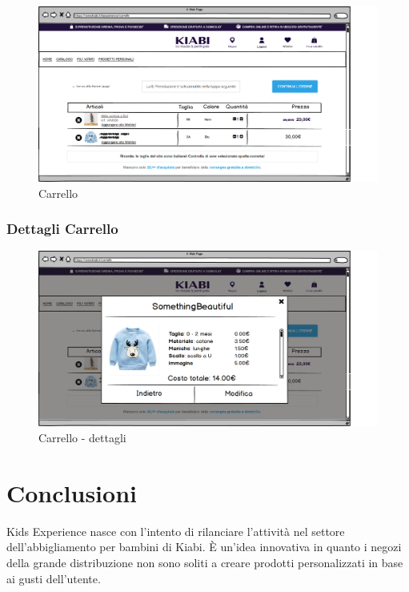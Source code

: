 \documentclass[12pt,italian,]{report}
\begin{document}
\begin{figure}[h]
\centering
\includegraphics{balsamiq/Carrello.png}
\caption{Carrello}
\label{carrello}
\end{figure}

\newpage
\subsubsection{Dettagli Carrello} 

\begin{figure}[h]
\centering
\includegraphics{balsamiq/Carrello dettagli.png}
\caption{Carrello - dettagli}
\label{carrello_dett}
\end{figure}


\newpage
\section{Conclusioni}

Kids Experience nasce con l'intento di rilanciare l'attività nel settore dell'abbigliamento per bambini di Kiabi. 
È un'idea innovativa in quanto i negozi della grande distribuzione non sono soliti a creare prodotti personalizzati in base ai gusti dell'utente. 
\end{document}
